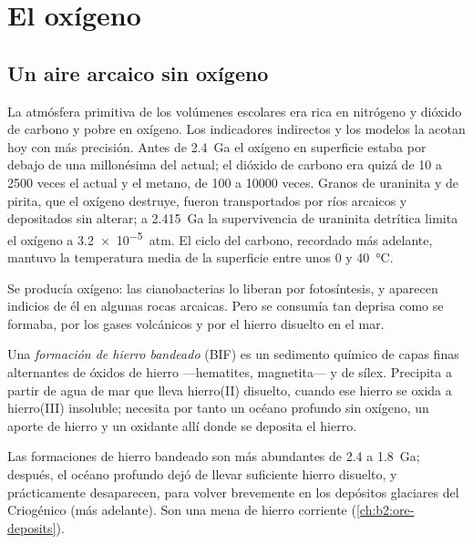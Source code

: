 \section{El oxígeno}\label{sec:b2:precambrian-earth:oxygen}

\subsection*{Un aire arcaico sin oxígeno}

La atmósfera primitiva de los volúmenes escolares era rica en nitrógeno y dióxido de carbono y
pobre en oxígeno. Los indicadores indirectos y los modelos la acotan hoy con más precisión. Antes de \qty{2.4}{Ga} el oxígeno
en superficie estaba por debajo de una millonésima del actual; el dióxido de carbono era quizá de 10 a 2500
veces el actual y el metano, de 100 a \num{10000} veces. Granos de uraninita y de pirita, que
el oxígeno destruye, fueron transportados por ríos arcaicos y depositados sin alterar; a \qty{2.415}{Ga}
la supervivencia de uraninita detrítica limita el oxígeno a \qty{3.2e-5}{atm}. El ciclo del carbono, recordado
más adelante, mantuvo la temperatura media de la superficie entre unos 0 y \qty{40}{\celsius}.

Se producía oxígeno: las cianobacterias lo liberan por fotosíntesis, y aparecen indicios de él en
algunas rocas arcaicas. Pero se consumía tan deprisa como se formaba, por los gases volcánicos y por el hierro
disuelto en el mar.

\begin{definition}\label{def:b2:precambrian-earth:bif}
Una \emph{formación de hierro bandeado} (BIF) es un sedimento químico de
capas finas alternantes de óxidos de hierro ---hematites, magnetita--- y de sílex. Precipita
a partir de agua de mar que lleva hierro(II) disuelto, cuando ese hierro se oxida a
hierro(III) insoluble; necesita por tanto un océano profundo sin oxígeno, un aporte de hierro y un oxidante
allí donde se deposita el hierro.
\end{definition}

Las formaciones de hierro bandeado son más abundantes de 2.4 a \qty{1.8}{Ga}; después, el océano profundo
dejó de llevar suficiente hierro disuelto, y prácticamente desaparecen, para volver brevemente en los
depósitos glaciares del Criogénico (más adelante). Son una mena de hierro corriente
(\cref{ch:b2:ore-deposits}).

